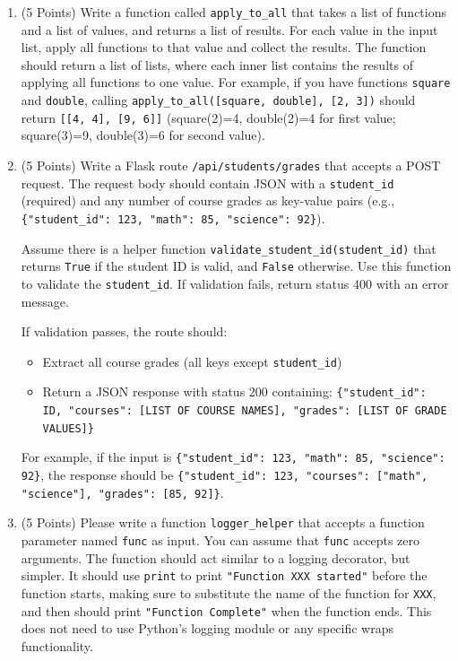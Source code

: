 \documentclass[11pt]{article}
\begin{document}
\begin{enumerate}
\item (5 Points) Write a function called \texttt{apply\_to\_all} that takes a list of functions and a list of values, and returns a list of results. For each value in the input list, apply all functions to that value and collect the results. The function should return a list of lists, where each inner list contains the results of applying all functions to one value. For example, if you have functions \texttt{square} and \texttt{double}, calling \texttt{apply\_to\_all([square, double], [2, 3])} should return \texttt{[[4, 4], [9, 6]]} (square(2)=4, double(2)=4 for first value; square(3)=9, double(3)=6 for second value).

\newpage

\item (5 Points) Write a Flask route \texttt{/api/students/grades} that accepts a POST request. The request body should contain JSON with a \texttt{student\_id} (required) and any number of course grades as key-value pairs (e.g., \texttt{\{"student\_id": 123, "math": 85, "science": 92\}}). 

Assume there is a helper function \texttt{validate\_student\_id(student\_id)} that returns \texttt{True} if the student ID is valid, and \texttt{False} otherwise. Use this function to validate the \texttt{student\_id}. If validation fails, return status 400 with an error message.

If validation passes, the route should:
\begin{itemize}
    \item Extract all course grades (all keys except \texttt{student\_id})
    \item Return a JSON response with status 200 containing: \texttt{\{"student\_id": ID, "courses": [LIST OF COURSE NAMES], "grades": [LIST OF GRADE VALUES]\}}
\end{itemize}
For example, if the input is \texttt{\{"student\_id": 123, "math": 85, "science": 92\}}, the response should be \texttt{\{"student\_id": 123, "courses": ["math", "science"], "grades": [85, 92]\}}.

\vspace{7cm}


\item (5 Points) Please write a function \texttt{logger\_helper} that accepts a function parameter named \texttt{func} as input. You can assume that \texttt{func} accepts zero arguments. The function should act similar to a logging decorator, but simpler. It should use \texttt{print} to print \texttt{"Function XXX started"} before the function starts, making sure to substitute the name of the function for \texttt{XXX}, and then should print \texttt{"Function Complete"} when the function ends. This does not need to use Python's logging module or any specific wraps functionality. 



\end{enumerate}
\end{document}
